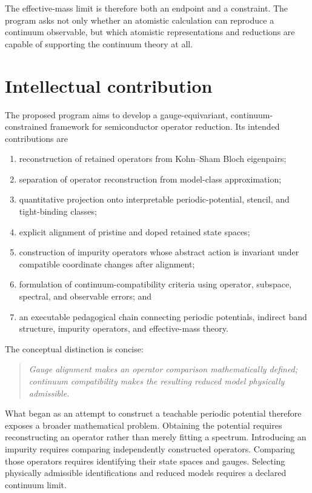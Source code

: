 The effective-mass limit is therefore both an endpoint and a constraint. The
program asks not only whether an atomistic calculation can reproduce a
continuum observable, but which atomistic representations and reductions are
capable of supporting the continuum theory at all.

\section{Intellectual contribution}

The proposed program aims to develop a gauge-equivariant,
continuum-constrained framework for semiconductor operator reduction. Its
intended contributions are
\begin{enumerate}
    \item reconstruction of retained operators from Kohn--Sham Bloch
          eigenpairs;
    \item separation of operator reconstruction from model-class
          approximation;
    \item quantitative projection onto interpretable periodic-potential,
          stencil, and tight-binding classes;
    \item explicit alignment of pristine and doped retained state spaces;
    \item construction of impurity operators whose abstract action is invariant
          under compatible coordinate changes after alignment;
    \item formulation of continuum-compatibility criteria using operator,
          subspace, spectral, and observable errors; and
    \item an executable pedagogical chain connecting periodic potentials,
          indirect band structure, impurity operators, and effective-mass
          theory.
\end{enumerate}

The conceptual distinction is concise:
\begin{quote}
\itshape
Gauge alignment makes an operator comparison mathematically defined;
continuum compatibility makes the resulting reduced model physically
admissible.
\end{quote}

What began as an attempt to construct a teachable periodic potential therefore
exposes a broader mathematical problem. Obtaining the potential requires
reconstructing an operator rather than merely fitting a spectrum. Introducing
an impurity requires comparing independently constructed operators. Comparing
those operators requires identifying their state spaces and gauges. Selecting
physically admissible identifications and reduced models requires a declared
continuum limit.

